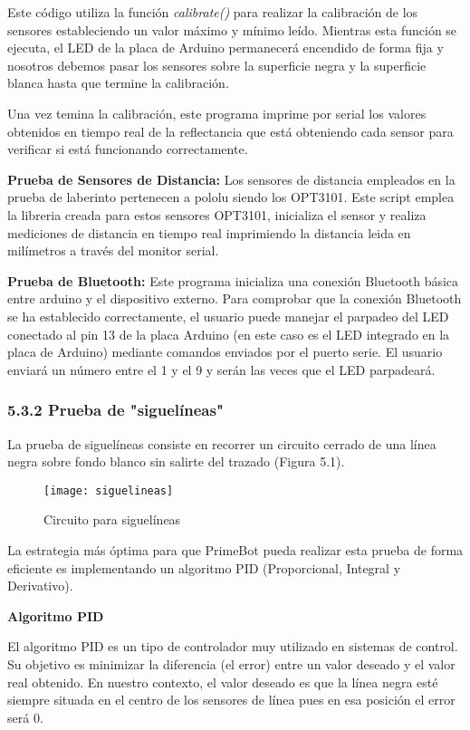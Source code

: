 Este código utiliza la función \emph{calibrate()} para realizar la calibración de los sensores estableciendo un valor máximo y mínimo leído. Mientras esta función se ejecuta, el LED de la placa de Arduino permanecerá encendido de forma fija y nosotros debemos pasar los sensores sobre la superficie negra y la superficie blanca hasta que termine la calibración.

Una vez temina la calibración, este programa imprime por serial los valores obtenidos en tiempo real de la reflectancia que está obteniendo cada sensor para verificar si está funcionando correctamente.

\textbf{Prueba de Sensores de Distancia:} Los sensores de distancia empleados en la prueba de laberinto pertenecen a pololu siendo los OPT3101.
Este script emplea la libreria creada para estos sensores OPT3101, inicializa el sensor y realiza mediciones de distancia en tiempo real imprimiendo la distancia leida en milímetros a través del monitor serial.

\textbf{Prueba de Bluetooth:}  Este programa inicializa una conexión Bluetooth básica entre arduino y el dispositivo externo. Para comprobar que la conexión Bluetooth se ha establecido correctamente, el usuario puede manejar el parpadeo del LED conectado al pin 13 de la placa Arduino (en este caso es el LED integrado en la placa de Arduino) mediante comandos enviados por el puerto serie.
El usuario enviará un número entre el 1 y el 9 y serán las veces que el LED parpadeará.

\subsubsection{5.3.2 Prueba de "siguelíneas"}\label{siguelíneas}

La prueba de siguelíneas consiste en recorrer un circuito cerrado de una línea negra sobre fondo blanco sin salirte del trazado (Figura 5.1).

\begin{figure}[h]
	\centering
	\texttt{[image: siguelineas]}
	\caption{Circuito para siguelíneas}
	\label{fig:5.1}
\end{figure}

La estrategia más óptima para que PrimeBot pueda realizar esta prueba de forma eficiente es implementando un algoritmo PID (Proporcional, Integral y Derivativo).

\textbf{Algoritmo PID}
 
 El algoritmo PID es un tipo de controlador muy utilizado en sistemas de control. Su objetivo es minimizar la diferencia (el error) entre un valor deseado y el valor real obtenido.
 En nuestro contexto, el valor deseado es que la línea negra esté siempre situada en el centro de los sensores de línea pues en esa posición el error será 0.
 

